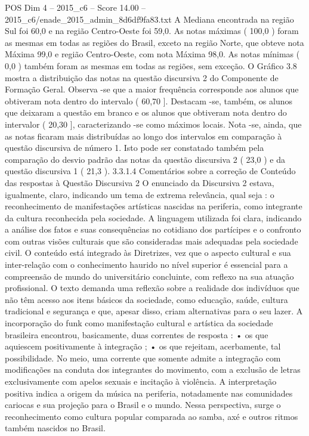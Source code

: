 \begin{textsample}{POS Dim 4 – 2015\_c6 – Score 14.00 – 2015\_c6/enade\_2015\_admin\_8d6df9fa83.txt}
A Mediana encontrada na região Sul foi 60,0 e na região Centro-Oeste foi 59,0.
As notas máximas ( 100,0 ) foram as mesmas em todas as regiões do Brasil, exceto na região Norte, que obteve nota Máxima 99,0 e região Centro-Oeste, com nota Máxima 98,0.
As notas mínimas ( 0,0 ) também foram as mesmas em todas as regiões, sem exceção.
O Gráfico 3.8 mostra a distribuição das notas na questão discursiva 2 do Componente de Formação Geral.
Observa -se que a maior frequência corresponde aos alunos que obtiveram nota dentro do intervalo ( 60,70 ].
Destacam -se, também, os alunos que deixaram a questão em branco e os alunos que obtiveram nota dentro do intervalor ( 20,30 ], caracterizando -se como máximos locais.
Nota -se, ainda, que as notas ficaram mais distribuídas ao longo dos intervalos em comparação à questão discursiva de número 1.
Isto pode ser constatado também pela comparação do desvio padrão das notas da questão discursiva 2 ( 23,0 ) e da questão discursiva 1 ( 21,3 ). 3.3.1.4 Comentários sobre a correção de Conteúdo das respostas à Questão Discursiva 2 O enunciado da Discursiva 2 estava, igualmente, claro, indicando um tema de extrema relevância, qual seja : o reconhecimento de manifestações artísticas nascidas na periferia, como integrante da cultura reconhecida pela sociedade.
A linguagem utilizada foi clara, indicando a análise dos fatos e suas consequências no cotidiano dos partícipes e o confronto com outras visões culturais que são consideradas mais adequadas pela sociedade civil.
O conteúdo está integrado às Diretrizes, vez que o aspecto cultural e sua inter-relação com o conhecimento haurido no nível superior é essencial para a compreensão de mundo do universitário concluinte, com reflexo na sua atuação profissional.
O texto demanda uma reflexão sobre a realidade dos indivíduos que não têm acesso aos itens básicos da sociedade, como educação, saúde, cultura tradicional e segurança e que, apesar disso, criam alternativas para o seu lazer.
A incorporação do funk como manifestação cultural e artística da sociedade brasileira encontrou, basicamente, duas correntes de resposta : • os que aquiescem positivamente à integração ; • os que rejeitam, acerbamente, tal possibilidade.
No meio, uma corrente que somente admite a integração com modificações na conduta dos integrantes do movimento, com a exclusão de letras exclusivamente com apelos sexuais e incitação à violência.
A interpretação positiva indica a origem da música na periferia, notadamente nas comunidades cariocas e sua projeção para o Brasil e o mundo.
Nessa perspectiva, surge o reconhecimento como cultura popular comparada ao samba, axé e outros ritmos também nascidos no Brasil.

\end{textsample}

